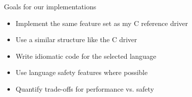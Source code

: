 \documentclass[NET,english,aspectratio=43,notitleframe]{tumbeamer}
\begin{document}




\begin{frame}{Goals for our implementations}
\begin{itemize}
\item Implement the same feature set as my C reference driver
\item Use a similar structure like the C driver
\item Write idiomatic code for the selected language
\item Use language safety features where possible
\item Quantify trade-offs for performance vs. safety
\end{itemize}
\end{frame}
\end{document}
